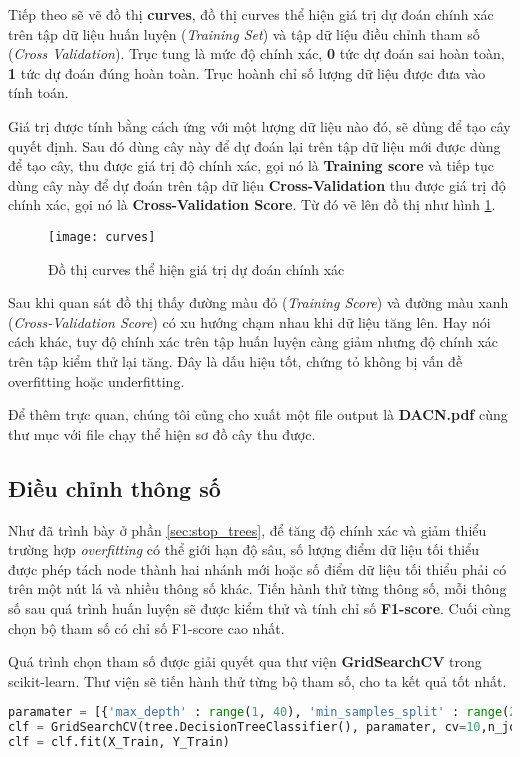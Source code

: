 \documentclass[../main-report.tex]{subfiles}
\begin{document}
Tiếp theo sẽ vẽ đồ thị \textbf{curves}, đồ thị curves thể hiện giá trị dự đoán chính xác trên tập dữ liệu huấn luyện (\emph{Training Set}) và tập dữ liệu điều chỉnh tham số (\emph{Cross Validation}). Trục tung là mức độ chính xác, \textbf{0} tức dự đoán sai hoàn toàn, \textbf{1} tức dự đoán đúng hoàn toàn. Trục hoành chỉ số lượng dữ liệu được đưa vào tính toán.

Giá trị được tính bằng cách ứng với một lượng dữ liệu nào đó, sẽ dùng để tạo cây quyết định. Sau đó dùng cây này để dự đoán lại trên tập dữ liệu mới được dùng để tạo cây, thu được giá trị độ chính xác, gọi nó là \textbf{Training score} và tiếp tục dùng cây này để dự đoán trên tập dữ liệu \textbf{Cross-Validation} thu được giá trị độ chính xác, gọi nó là \textbf{Cross-Validation Score}. Từ đó vẽ lên đồ thị như hình \ref{fig:res_curves}.

\begin{figure}[ht!]
\centering\texttt{[image: curves]}
\caption{Đồ thị curves thể hiện giá trị dự đoán chính xác}
\label{fig:res_curves}
\end{figure}

Sau khi quan sát đồ thị thấy đường màu đỏ (\emph{Training Score}) và đường màu xanh (\emph{Cross-Validation Score}) có xu hướng chạm nhau khi dữ liệu tăng lên. Hay nói cách khác, tuy độ chính xác trên tập huấn luyện càng giảm nhưng độ chính xác trên tập kiểm thử lại tăng. Đây là dấu hiệu tốt, chứng tỏ không bị vấn đề overfitting hoặc underfitting.

Để thêm trực quan, chúng tôi cũng cho xuất một file output là \textbf{DACN.pdf} cùng thư mục với file chạy thể hiện sơ đồ cây thu được.
\subsection{Điều chỉnh thông số}
Như đã trình bày ở phần \ref{sec:stop_trees}, để tăng độ chính xác và giảm thiểu trường hợp \emph{overfitting} có thể giới hạn độ sâu, số lượng điểm dữ liệu tối thiểu được phép tách node thành hai nhánh mới hoặc số điểm dữ liệu tối thiểu phải có trên một nút lá và nhiều thông số khác. Tiến hành thử từng thông số, mỗi thông số sau quá trình huấn luyện sẽ được kiểm thử và tính chỉ số \textbf{F1-score}. Cuối cùng chọn bộ tham số có chỉ số F1-score cao nhất.

Quá trình chọn tham số được giải quyết qua thư viện \textbf{GridSearchCV} trong scikit-learn. Thư viện sẽ tiến hành thử từng bộ tham số, cho ta kết quả tốt nhất.

\begin{lstlisting}[language=Python]
paramater = [{'max_depth' : range(1, 40), 'min_samples_split' : range(2,50), 'min_samples_leaf' : range(1,10)}]
clf = GridSearchCV(tree.DecisionTreeClassifier(), paramater, cv=10,n_jobs=6)
clf = clf.fit(X_Train, Y_Train)
\end{lstlisting}
\end{document}
